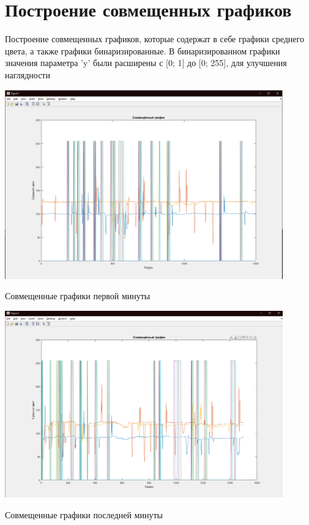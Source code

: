 \documentclass[a4paper,12pt]{article}
\begin{document}
\section*{Построение совмещенных графиков}
Построение совмещенных графиков, которые содержат в себе графики среднего цвета,
а также графики бинаризированные. В бинаризированном графики значения
параметра 'y' были расширены с [0; 1] до [0; 255], для улучшения наглядности
\begin{center}
\includegraphics[width=0.9\textwidth]{merge_first.png}
\end{center}
\begin{center}
Совмещенные графики первой минуты
\end{center}
\begin{center}
\includegraphics[width=0.9\textwidth]{merge_last.png}
\end{center}
\begin{center}
Совмещенные графики последней минуты 
\end{center}
\end{document}
